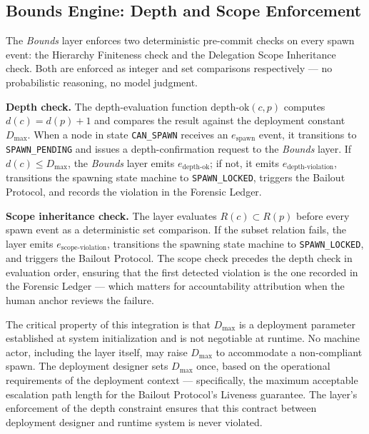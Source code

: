 \subsection{Bounds Engine: Depth and Scope Enforcement}
\label{sec:rs-bounds-depth}

The \textit{Bounds} layer enforces two deterministic pre-commit checks on every
spawn event: the Hierarchy Finiteness check and the Delegation Scope Inheritance
check.  Both are enforced as integer and set comparisons respectively — no
probabilistic reasoning, no model judgment.

\medskip
\noindent\textbf{Depth check.}  The depth-evaluation function
$\text{depth-ok}(c, p)$ computes $d(c) = d(p) + 1$ and compares the result
against the deployment constant $D_{\max}$.  When a node in state
\texttt{CAN\_SPAWN} receives an $e_{\text{spawn}}$ event, it transitions to
\texttt{SPAWN\_PENDING} and issues a depth-confirmation request to the
\textit{Bounds} layer.  If $d(c) \leq D_{\max}$, the \textit{Bounds} layer emits
$e_{\text{depth-ok}}$; if not, it emits $e_{\text{depth-violation}}$,
transitions the spawning state machine to \texttt{SPAWN\_LOCKED}, triggers the
Bailout Protocol, and records the violation in the Forensic Ledger.

\medskip
\noindent\textbf{Scope inheritance check.}  The \bounds{} layer evaluates
$R(c) \subset R(p)$ before every spawn event as a deterministic set comparison.
If the subset relation fails, the \bounds{} layer emits
$e_{\text{scope-violation}}$, transitions the spawning state machine to
\texttt{SPAWN\_LOCKED}, and triggers the Bailout Protocol.  The scope check
precedes the depth check in evaluation order, ensuring that the first detected
violation is the one recorded in the Forensic Ledger — which matters for
accountability attribution when the human anchor reviews the failure.

The critical property of this integration is that $D_{\max}$ is a deployment
parameter established at system initialization and is not negotiable at runtime.
No machine actor, including the \bounds{} layer itself, may raise $D_{\max}$ to
accommodate a non-compliant spawn.  The deployment designer sets $D_{\max}$ once,
based on the operational requirements of the deployment context — specifically,
the maximum acceptable escalation path length for the Bailout Protocol's Liveness
guarantee.  The \bounds{} layer's enforcement of the depth constraint ensures that
this contract between deployment designer and runtime system is never violated.

